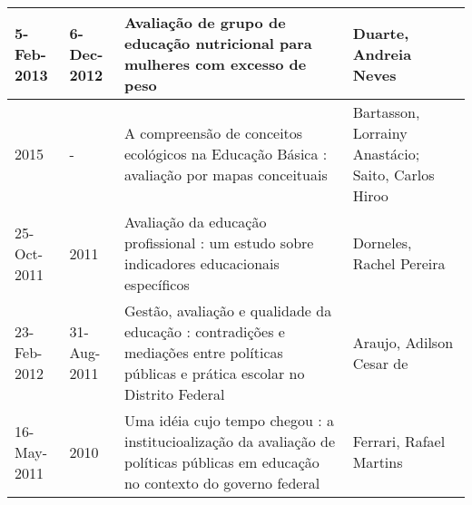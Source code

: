 \begin{table}
{\begin{tabular}{|m{1.3cm}|m{1.3cm}|p{7cm}|p{6cm}|}
5-Feb-2013  & 6-Dec-2012  & Avaliação de grupo de educação nutricional para mulheres com excesso de peso                                                                                                                                          & Duarte, Andreia Neves                                                                                                                                                                                                                                        \\ \hline
2015        & -           & A compreensão de conceitos ecológicos na Educação Básica : avaliação por mapas conceituais                                                                                                                            & Bartasson, Lorrainy Anastácio; Saito, Carlos Hiroo                                                                                                                                                                                                           \\ \hline
25-Oct-2011 & 2011        & Avaliação da educação profissional : um estudo sobre indicadores educacionais específicos                                                                                                                             & Dorneles, Rachel Pereira                                                                                                                                                                                                                                     \\ \hline
23-Feb-2012 & 31-Aug-2011 & Gestão, avaliação e qualidade da educação : contradições e mediações entre políticas públicas e prática escolar no Distrito Federal                                                                                   & Araujo, Adilson Cesar de                                                                                                                                                                                                                                     \\ \hline
16-May-2011 & 2010        & Uma idéia cujo tempo chegou : a institucioalização da avaliação de políticas públicas em educação no contexto do governo federal                                                                                      & Ferrari, Rafael Martins                                                                                                                                                                                                                                      \\ \hline

\end{tabular}}
\end{table}
